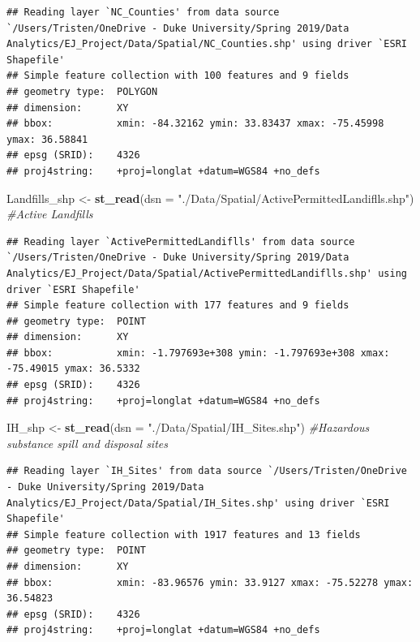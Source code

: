 \documentclass[12pt,]{article}
\newenvironment{Shaded}{\begin{snugshade}}{\end{snugshade}}
\newcommand{\KeywordTok}[1]{\textcolor[rgb]{0.13,0.29,0.53}{\textbf{#1}}}
\newcommand{\DataTypeTok}[1]{\textcolor[rgb]{0.13,0.29,0.53}{#1}}
\newcommand{\StringTok}[1]{\textcolor[rgb]{0.31,0.60,0.02}{#1}}
\newcommand{\CommentTok}[1]{\textcolor[rgb]{0.56,0.35,0.01}{\textit{#1}}}
\newcommand{\NormalTok}[1]{#1}
\begin{document}
\begin{verbatim}
## Reading layer `NC_Counties' from data source `/Users/Tristen/OneDrive - Duke University/Spring 2019/Data Analytics/EJ_Project/Data/Spatial/NC_Counties.shp' using driver `ESRI Shapefile'
## Simple feature collection with 100 features and 9 fields
## geometry type:  POLYGON
## dimension:      XY
## bbox:           xmin: -84.32162 ymin: 33.83437 xmax: -75.45998 ymax: 36.58841
## epsg (SRID):    4326
## proj4string:    +proj=longlat +datum=WGS84 +no_defs
\end{verbatim}

\begin{Shaded}
\begin{Highlighting}[]
\NormalTok{Landfills_shp <-}\StringTok{ }\KeywordTok{st_read}\NormalTok{(}\DataTypeTok{dsn =} \StringTok{"./Data/Spatial/ActivePermittedLandiflls.shp"}\NormalTok{) }\CommentTok{#Active Landfills}
\end{Highlighting}
\end{Shaded}

\begin{verbatim}
## Reading layer `ActivePermittedLandiflls' from data source `/Users/Tristen/OneDrive - Duke University/Spring 2019/Data Analytics/EJ_Project/Data/Spatial/ActivePermittedLandiflls.shp' using driver `ESRI Shapefile'
## Simple feature collection with 177 features and 9 fields
## geometry type:  POINT
## dimension:      XY
## bbox:           xmin: -1.797693e+308 ymin: -1.797693e+308 xmax: -75.49015 ymax: 36.5332
## epsg (SRID):    4326
## proj4string:    +proj=longlat +datum=WGS84 +no_defs
\end{verbatim}

\begin{Shaded}
\begin{Highlighting}[]
\NormalTok{IH_shp <-}\StringTok{ }\KeywordTok{st_read}\NormalTok{(}\DataTypeTok{dsn =} \StringTok{"./Data/Spatial/IH_Sites.shp"}\NormalTok{) }\CommentTok{#Hazardous substance spill and disposal sites }
\end{Highlighting}
\end{Shaded}

\begin{verbatim}
## Reading layer `IH_Sites' from data source `/Users/Tristen/OneDrive - Duke University/Spring 2019/Data Analytics/EJ_Project/Data/Spatial/IH_Sites.shp' using driver `ESRI Shapefile'
## Simple feature collection with 1917 features and 13 fields
## geometry type:  POINT
## dimension:      XY
## bbox:           xmin: -83.96576 ymin: 33.9127 xmax: -75.52278 ymax: 36.54823
## epsg (SRID):    4326
## proj4string:    +proj=longlat +datum=WGS84 +no_defs
\end{verbatim}
\end{document}
